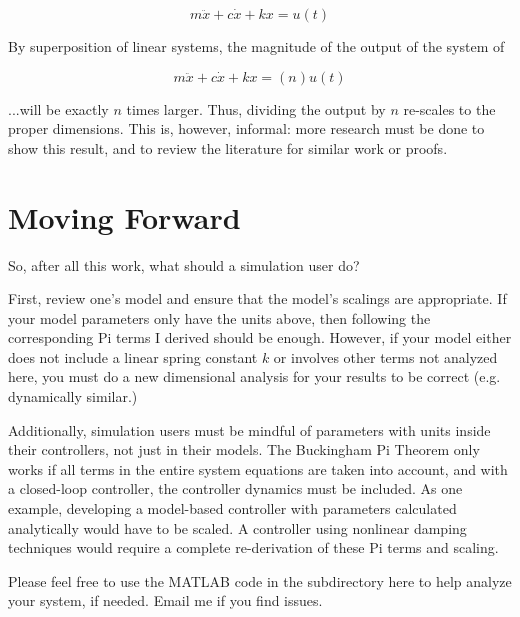 \documentclass[12pt,letterpaper]{article}
\begin{document}
\[
m \ddot x + c \dot x + k x = u(t)
\]

By superposition of linear systems, the magnitude of the output of the system of

\[
m \ddot x + c \dot x + k x = (n) u(t)
\]

...will be exactly $n$ times larger. Thus, dividing the output by $n$ re-scales to the proper dimensions.
This is, however, informal: more research must be done to show this result, and to review the literature for similar work or proofs.

\section{Moving Forward}

So, after all this work, what should a simulation user do? 

First, review one's model and ensure that the model's scalings are appropriate.
If your model parameters only have the units above, then following the corresponding Pi terms I derived should be enough.
However, if your model either does not include a linear spring constant $k$ or involves other terms not analyzed here, you must do a new dimensional analysis for your results to be correct (e.g. dynamically similar.)

Additionally, simulation users must be mindful of parameters with units inside their controllers, not just in their models.
The Buckingham Pi Theorem only works if all terms in the entire system equations are taken into account, and with a closed-loop controller, the controller dynamics must be included.
As one example, developing a model-based controller with parameters calculated analytically would have to be scaled. 
A controller using nonlinear damping techniques would require a complete re-derivation of these Pi terms and scaling.

Please feel free to use the MATLAB code in the subdirectory here to help analyze your system, if needed. Email me if you find issues.



\end{document}
